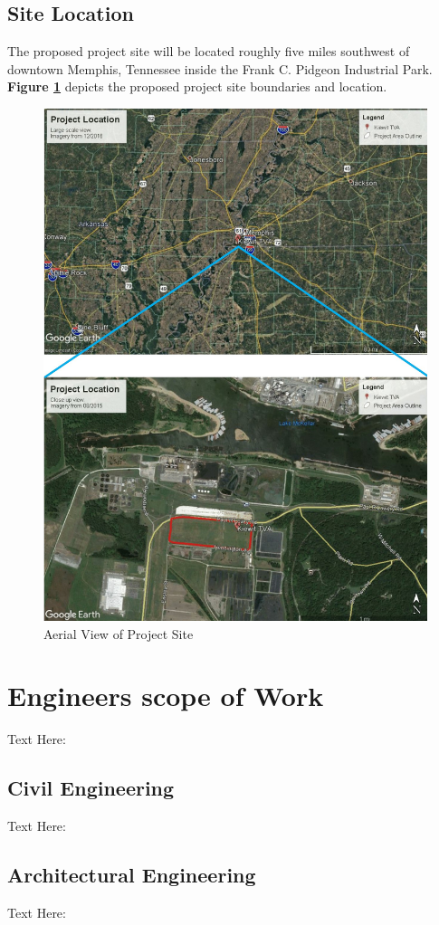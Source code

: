 \documentclass{ceri}
\begin{document}
\subsection{Site Location}
The proposed project site will be located roughly five miles southwest of downtown Memphis, Tennessee inside the Frank C. Pidgeon Industrial Park. \textbf{Figure \ref{fig:Location}} depicts the proposed project site boundaries and location. 
\begin{figure}[H]
    \centering
    \includegraphics[width=.8\textwidth]{images/Location.png}
    \caption{Aerial View of Project Site}
    \label{fig:Location}
\end{figure}
\section{Engineers scope of Work}
Text Here:

\subsection{Civil Engineering}
Text Here:

\subsection{Architectural Engineering}
Text Here:
\end{document}
